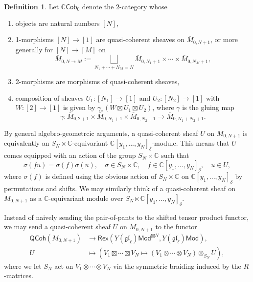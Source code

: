 \documentclass[11pt]{report}
\theoremstyle{definition}
\newtheorem{definition}[theorem]{Definition}
\theoremstyle{remark}
\theoremstyle{remark}
\newcommand{\C}{\mathbb{C}}
\begin{document}
\begin{definition}
Let $\C\mathsf{Cob}_0$ denote the $2$-category whose
\begin{enumerate}[label=(\roman*)]
\item objects are natural numbers $[N]$,
\item 1-morphisms $[N] \to [1]$ are quasi-coherent sheaves on $\overline{M}_{0,N+1}$, or more generally for $[N] \to [M]$ on
\begin{equation*}
\overline{M}_{0,N \to M} := \bigsqcup_{N_1+\cdots+N_M=N} \overline{M}_{0,N_1+1} \times \cdots \times \overline{M}_{0,N_M+1},
\end{equation*}
\item 2-morphisms are morphisms of quasi-coherent sheaves,
\item composition of sheaves $U_1: [N_1] \to [1]$ and $U_2: [N_2] \to [1]$ with $W: [2] \to [1]$ is given by $\gamma_*(W \boxtimes U_1 \boxtimes U_2)$, where $\gamma$ is the gluing map
\begin{equation*}
\gamma: \overline{M}_{0,2+1} \times \overline{M}_{0,N_1+1} \times \overline{M}_{0,N_2+1} \to \overline{M}_{0,N_1+N_2+1}.
\end{equation*}
\end{enumerate}
\end{definition}

By general algebro-geometrcic arguments, a quasi-coherent sheaf $U$ on $M_{0,N+1}$ is equivalently an $S_N \times \C$-equivariant $\C[y_1,...,y_N]_\delta$-module. This means that $U$ comes equipped with an action of the group $S_N \times \C$ such that
\begin{equation*}
\sigma(fu) = \sigma(f) \sigma(u), \quad \sigma \in S_N \times \C, \quad f \in \C[y_1,...,y_N]_\delta, \quad u \in U,
\end{equation*}
where $\sigma(f)$ is defined using the obvious action of $S_N \times \C$ on $\C[y_1,...,y_N]_\delta$ by permutations and shifts. We may similarly think of a quasi-coherent sheaf on $M_{0,N+1}$ as a $\C$-equivariant module over $S_N \ltimes \C[y_1,...,y_N]_\delta$.

Instead of naively sending the pair-of-pants to the shifted tensor product functor, we may send a quasi-coherent sheaf $U$ on $M_{0,N+1}$ to the functor
\begin{align*}
\mathsf{QCoh}(M_{0,N+1}) &\to \mathsf{Rex}(Y(\mathfrak{gl}_\ell)\mathsf{Mod}^{\boxtimes N},Y(\mathfrak{gl}_\ell)\mathsf{Mod}), \\
U &\mapsto (V_1 \boxtimes \cdots \boxtimes V_N \mapsto (V_1 \otimes \cdots \otimes V_N) \otimes_{S_N} U),
\end{align*}
where we let $S_N$ act on $V_1 \otimes \cdots \otimes V_N$ via the symmetric braiding induced by the $R$-matrices.
\end{document}

